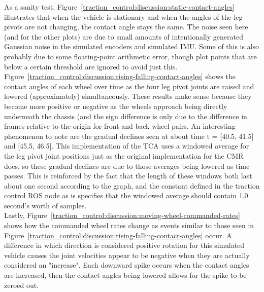 As a sanity test, Figure~\ref{traction_control:discussion:static-contact-angles} illustrates that when the vehicle is stationary and when the angles of the leg pivots are not changing, the contact angle stays the same. The noise seen here (and for the other plots) are due to small amounts of intentionally generated Gaussian noise in the simulated encoders and simulated \ac{IMU}. Some of this is also probably due to some floating-point arithmetic error, though plot points that are below a certain threshold are ignored to avoid just this. \\

Figure~\ref{traction_control:discussion:rising-falling-contact-angles} shows the contact angles of each wheel over time as the four leg pivot joints are raised and lowered (approximately) simultaneously. These results make sense because they become more positive or negative as the wheels approach being directly underneath the chassis (and the sign difference is only due to the difference in frames relative to the origin for front and back wheel pairs. An interesting phenomenon to note are the gradual declines seen at about time t = [40.5, 41.5] and [45.5, 46.5]. This implementation of the \ac{TCA} uses a windowed average for the leg pivot joint positions just as the original implementation for the \ac{CMR} does, so these gradual declines are due to those averages being lowered as time passes. This is reinforced by the fact that the length of these windows both last about one second according to the graph, and the constant defined in the traction control ROS node as is specifies that the windowed average should contain 1.0 second's worth of samples. \\

Lastly, Figure~\ref{traction_control:discussion:moving-wheel-commanded-rates} shows how the commanded wheel rates change as events similar to those seen in Figure~\ref{traction_control:discussion:rising-falling-contact-angles} occur. A difference in which direction is considered positive rotation for this simulated vehicle causes the joint velocities appear to be negative when they are actually considered an "increase". Each downward spike occurs when the contact angles are increased, then the contact angles being lowered allows for the spike to be zeroed out.

